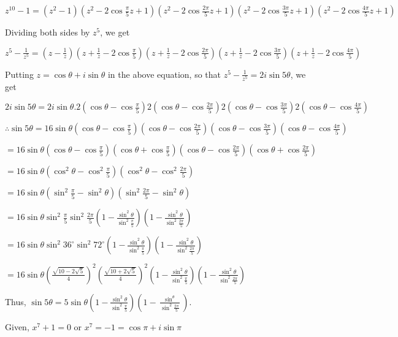   $z^{10} - 1 = (z^2 - 1)\left(z^2 - 2\cos\frac{\pi}{5}z + 1\right)\left(z^2 - 2\cos\frac{2\pi}{5}z +
  1\right)\left(z^2 - 2\cos\frac{3\pi}{5}z + 1\right)\left(z^2 - 2\cos\frac{4\pi}{5}z + 1\right)$

  Dividing both sides by $z^5$, we get

  $z^5 - \frac{1}{z^5} = \left(z - \frac{1}{z}\right)\left(z + \frac{1}{z}
  - 2\cos\frac{\pi}{5}\right)\left(z + \frac{1}{z}
  - 2\cos\frac{2\pi}{5}\right)\left(z + \frac{1}{z}
  - 2\cos\frac{3\pi}{5}\right)\left(z + \frac{1}{z}
  - 2\cos\frac{4\pi}{5}\right)$

  Putting $z = \cos \theta + i \sin \theta$ in the above equation, so
  that $z^5 - \frac{1}{z^5} = 2i\sin 5\theta$, we get

  $2i\sin 5\theta = 2i\sin\theta.2\left(\cos \theta -
  \cos\frac{\pi}{5}\right)2\left(\cos \theta -
  \cos\frac{2\pi}{5}\right)2\left(\cos \theta -
  \cos\frac{3\pi}{5}\right)2\left(\cos \theta - \cos\frac{4\pi}{5}\right)$

  $\therefore \sin 5\theta = 16 \sin \theta\left(\cos \theta -
  \cos\frac{\pi}{5}\right)\left(\cos \theta -
  \cos\frac{2\pi}{5}\right)\left(\cos \theta -
  \cos\frac{3\pi}{5}\right)\left(\cos \theta - \cos\frac{4\pi}{5}\right)$

  $= 16\sin \theta\left(\cos\theta
  -\cos\frac{\pi}{5}\right)\left(\cos\theta
  +\cos\frac{\pi}{5}\right)\left(\cos\theta
  -\cos\frac{2\pi}{5}\right)\left(\cos\theta +\cos\frac{2\pi}{5}\right)$

  $= 16\sin \theta\left(\cos^2\theta -
  \cos^2\frac{\pi}{5}\right)\left(\cos^2\theta -
  \cos^2\frac{2\pi}{5}\right)$

  $= 16\sin \theta\left(\sin^2\frac{\pi}{5} -
  \sin^2\theta\right)\left(\sin^2\frac{2\pi}{5} - \sin^2\theta\right)$

  $= 16\sin\theta\sin^2\frac{\pi}{5}\sin^2\frac{2\pi}{5}\left(1 -
  \frac{\sin^2\theta}{\sin^2\frac{\pi}{5}}\right)\left(1 -
  \frac{\sin^2\theta}{\sin^2\frac{2\pi}{5}}\right)$

  $= 16\sin\theta\sin^2{36^\circ}\sin^2{72^\circ}\left(1 -
  \frac{\sin^2\theta}{\sin^2\frac{\pi}{5}}\right)\left(1 -
  \frac{\sin^2\theta}{\sin^2\frac{2\pi}{5}}\right)$

  $= 16\sin\theta\left(\frac{\sqrt{10 - 2\sqrt{5}}}{4}\right)^2\left(\frac{\sqrt{10 +
      2\sqrt{5}}}{4}\right)^2\left(1 - \frac{\sin^2\theta}{\sin^2\frac{\pi}{5}}\right)\left(1 -
  \frac{\sin^2\theta}{\sin^2\frac{2\pi}{5}}\right)$

  Thus, $\sin5\theta = 5\sin\theta\left(1 - \frac{\sin^2\theta}{\sin^2\frac{\pi}{5}}\right)\left(1 -
  \frac{\sin^\theta}{\sin^2\frac{2\pi}{5}}\right)$.
\item Given, $x^7 + 1 = 0$ or $x^7 = -1 = \cos\pi + i \sin\pi$

